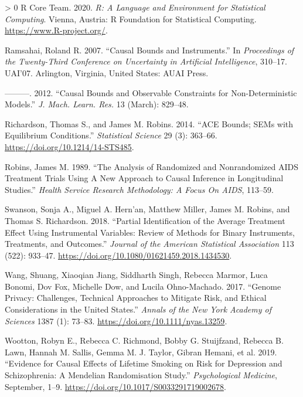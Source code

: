 \documentclass[
]{article}
\theoremstyle{plain}
\newlength{\cslhangindent}
\newenvironment{CSLReferences}[3] %
 {%
  \setlength{\parindent}{0pt}
  \ifodd #1 \everypar{\setlength{\hangindent}{\cslhangindent}}\ignorespaces\fi
  \ifnum #2 > 0
  \setlength{\parskip}{#2\baselineskip}
  \fi
 }%
 {}
\begin{document}
{\begin{CSLReferences}{1}{0}
\leavevmode\hypertarget{ref-R}{}%
R Core Team. 2020. \emph{R: A Language and Environment for Statistical Computing}. Vienna, Austria: R Foundation for Statistical Computing. \url{https://www.R-project.org/}.

\leavevmode\hypertarget{ref-ramsahai_causal_2007}{}%
Ramsahai, Roland R. 2007. {``Causal {Bounds} and {Instruments}.''} In \emph{Proceedings of the {Twenty}-{Third Conference} on {Uncertainty} in {Artificial Intelligence}}, 310--17. {UAI}'07. {Arlington, Virginia, United States}: {AUAI Press}.

\leavevmode\hypertarget{ref-ramsahai_causal_2012}{}%
---------. 2012. {``Causal {Bounds} and {Observable Constraints} for {Non}-Deterministic {Models}.''} \emph{J. Mach. Learn. Res.} 13 (March): 829--48.

\leavevmode\hypertarget{ref-richardson_ace_2014}{}%
Richardson, Thomas S., and James M. Robins. 2014. {``{ACE Bounds}; {SEMs} with {Equilibrium Conditions}.''} \emph{Statistical Science} 29 (3): 363--66. \url{https://doi.org/10.1214/14-STS485}.

\leavevmode\hypertarget{ref-robins_analysis_1989}{}%
Robins, James M. 1989. {``The {Analysis} of {Randomized} and {Nonrandomized AIDS Treatment Trials Using A New Approach} to {Causal Inference} in {Longitudinal Studies}.''} \emph{Health Service Research Methodology: A Focus On AIDS}, 113--59.

\leavevmode\hypertarget{ref-swanson_partial_2018}{}%
Swanson, Sonja A., Miguel A. Hern'an, Matthew Miller, James M. Robins, and Thomas S. Richardson. 2018. {``Partial {Identification} of the {Average Treatment Effect Using Instrumental Variables}: {Review} of {Methods} for {Binary Instruments}, {Treatments}, and {Outcomes}.''} \emph{Journal of the American Statistical Association} 113 (522): 933--47. \url{https://doi.org/10.1080/01621459.2018.1434530}.

\leavevmode\hypertarget{ref-wang_genome_2017}{}%
Wang, Shuang, Xiaoqian Jiang, Siddharth Singh, Rebecca Marmor, Luca Bonomi, Dov Fox, Michelle Dow, and Lucila Ohno-Machado. 2017. {``Genome Privacy: Challenges, Technical Approaches to Mitigate Risk, and Ethical Considerations in the {United States}.''} \emph{Annals of the New York Academy of Sciences} 1387 (1): 73--83. \url{https://doi.org/10.1111/nyas.13259}.

\leavevmode\hypertarget{ref-wootton_evidence_2019}{}%
Wootton, Robyn E., Rebecca C. Richmond, Bobby G. Stuijfzand, Rebecca B. Lawn, Hannah M. Sallis, Gemma M. J. Taylor, Gibran Hemani, et al. 2019. {``Evidence for Causal Effects of Lifetime Smoking on Risk for Depression and Schizophrenia: A {Mendelian} Randomisation Study.''} \emph{Psychological Medicine}, September, 1--9. \url{https://doi.org/10.1017/S0033291719002678}.

\end{CSLReferences}
\end{document}
